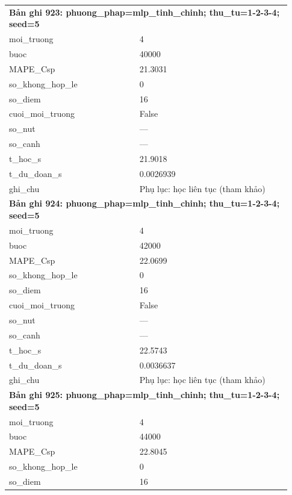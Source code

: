 \begin{longtable}{p{0.43\linewidth}p{0.50\linewidth}}
\midrule
\multicolumn{2}{p{0.95\linewidth}}{\textbf{Bản ghi 923: phuong\_phap=mlp\_tinh\_chinh; thu\_tu=1-2-3-4; seed=5}} \\
moi\_\allowbreak truong & 4 \\
buoc & 40000 \\
MAPE\_\allowbreak Csp & 21.3031 \\
so\_\allowbreak khong\_\allowbreak hop\_\allowbreak le & 0 \\
so\_\allowbreak diem & 16 \\
cuoi\_\allowbreak moi\_\allowbreak truong & False \\
so\_\allowbreak nut & — \\
so\_\allowbreak canh & — \\
t\_\allowbreak hoc\_\allowbreak s & 21.9018 \\
t\_\allowbreak du\_\allowbreak doan\_\allowbreak s & 0.0026939 \\
ghi\_\allowbreak chu & Phụ lục: học liên tục (tham khảo) \\
\midrule
\multicolumn{2}{p{0.95\linewidth}}{\textbf{Bản ghi 924: phuong\_phap=mlp\_tinh\_chinh; thu\_tu=1-2-3-4; seed=5}} \\
moi\_\allowbreak truong & 4 \\
buoc & 42000 \\
MAPE\_\allowbreak Csp & 22.0699 \\
so\_\allowbreak khong\_\allowbreak hop\_\allowbreak le & 0 \\
so\_\allowbreak diem & 16 \\
cuoi\_\allowbreak moi\_\allowbreak truong & False \\
so\_\allowbreak nut & — \\
so\_\allowbreak canh & — \\
t\_\allowbreak hoc\_\allowbreak s & 22.5743 \\
t\_\allowbreak du\_\allowbreak doan\_\allowbreak s & 0.0036637 \\
ghi\_\allowbreak chu & Phụ lục: học liên tục (tham khảo) \\
\midrule
\multicolumn{2}{p{0.95\linewidth}}{\textbf{Bản ghi 925: phuong\_phap=mlp\_tinh\_chinh; thu\_tu=1-2-3-4; seed=5}} \\
moi\_\allowbreak truong & 4 \\
buoc & 44000 \\
MAPE\_\allowbreak Csp & 22.8045 \\
so\_\allowbreak khong\_\allowbreak hop\_\allowbreak le & 0 \\
so\_\allowbreak diem & 16 \\

\end{longtable}
